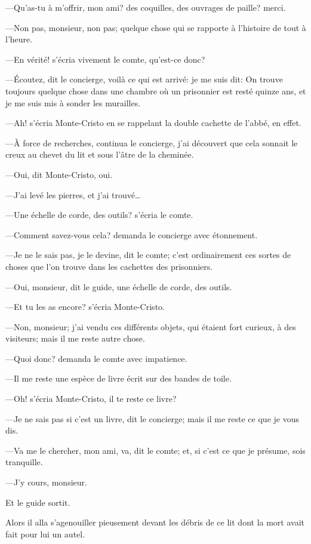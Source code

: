—Qu'as-tu à m'offrir, mon ami? des coquilles, des ouvrages de paille? merci. 

—Non pas, monsieur, non pas; quelque chose qui se rapporte à l'histoire de tout à l'heure. 

—En vérité! s'écria vivement le comte, qu'est-ce donc? 

—Écoutez, dit le concierge, voilà ce qui est arrivé: je me suis dit: On trouve toujours quelque chose dans une chambre où un prisonnier est resté quinze ans, et je me suis mis à sonder les murailles. 

—Ah! s'écria Monte-Cristo en se rappelant la double cachette de l'abbé, en effet. 

—À force de recherches, continua le concierge, j'ai découvert que cela sonnait le creux au chevet du lit et sous l'âtre de la cheminée. 

—Oui, dit Monte-Cristo, oui. 

—J'ai levé les pierres, et j'ai trouvé\dots 

—Une échelle de corde, des outils? s'écria le comte. 

—Comment savez-vous cela? demanda le concierge avec étonnement. 

—Je ne le sais pas, je le devine, dit le comte; c'est ordinairement ces sortes de choses que l'on trouve dans les cachettes des prisonniers. 

—Oui, monsieur, dit le guide, une échelle de corde, des outils. 

—Et tu les as encore? s'écria Monte-Cristo. 

—Non, monsieur; j'ai vendu ces différents objets, qui étaient fort curieux, à des visiteurs; mais il me reste autre chose. 

—Quoi donc? demanda le comte avec impatience. 

—Il me reste une espèce de livre écrit sur des bandes de toile. 

—Oh! s'écria Monte-Cristo, il te reste ce livre? 

—Je ne sais pas si c'est un livre, dit le concierge; mais il me reste ce que je vous dis. 

—Va me le chercher, mon ami, va, dit le comte; et, si c'est ce que je présume, sois tranquille. 

—J'y cours, monsieur. 

Et le guide sortit. 

Alors il alla s'agenouiller pieusement devant les débris de ce lit dont la mort avait fait pour lui un autel. 

